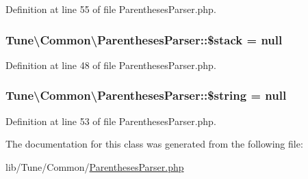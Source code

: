 Definition at line 55 of file Parentheses\-Parser.\-php.

\hypertarget{classTune_1_1Common_1_1ParenthesesParser_adcf5e7e5b906af22911f99d755e508a9}{
\subsubsection[{\$stack}]{\setlength{\rightskip}{0pt plus 5cm}Tune\textbackslash{}\-Common\textbackslash{}\-Parentheses\-Parser\-::\$stack = null\hspace{0.3cm}{\ttfamily [protected]}}}\label{classTune_1_1Common_1_1ParenthesesParser_adcf5e7e5b906af22911f99d755e508a9}


Definition at line 48 of file Parentheses\-Parser.\-php.

\hypertarget{classTune_1_1Common_1_1ParenthesesParser_ab016a5c5d09e086457c2ffebd0c0e83c}{
\subsubsection[{\$string}]{\setlength{\rightskip}{0pt plus 5cm}Tune\textbackslash{}\-Common\textbackslash{}\-Parentheses\-Parser\-::\$string = null\hspace{0.3cm}{\ttfamily [protected]}}}\label{classTune_1_1Common_1_1ParenthesesParser_ab016a5c5d09e086457c2ffebd0c0e83c}


Definition at line 53 of file Parentheses\-Parser.\-php.



The documentation for this class was generated from the following file\-:\begin{DoxyCompactItemize}
\item 
lib/\-Tune/\-Common/\hyperlink{ParenthesesParser_8php}{Parentheses\-Parser.\-php}\end{DoxyCompactItemize}
